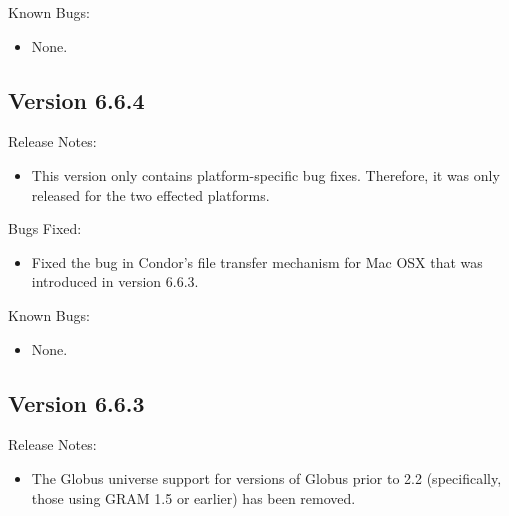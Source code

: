 \noindent Known Bugs:

\begin{itemize}

\item None.

\end{itemize}



\subsection{\label{sec:New-6-6-4}Version 6.6.4}

\noindent Release Notes:

\begin{itemize}

\item This version only contains platform-specific bug fixes.
  Therefore, it was only released for the two effected platforms. 

\end{itemize}

\noindent Bugs Fixed:

\begin{itemize}

\item Fixed the bug in Condor's file transfer mechanism for Mac OSX
  that was introduced in version 6.6.3.

\end{itemize}

\noindent Known Bugs:

\begin{itemize}

\item None.

\end{itemize}



\subsection{\label{sec:New-6-6-3}Version 6.6.3}

\noindent Release Notes:

\begin{itemize}

\item The Globus universe support for versions of Globus prior to 2.2 (specifically, those using GRAM 1.5 or earlier) has been removed.

\end{itemize}


